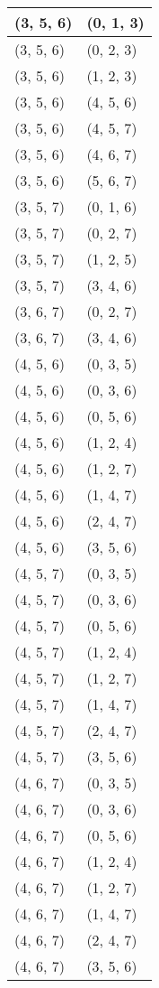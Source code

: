 \begin{footnotesize}
\begin{longtable}[c]{|l|l|}
(3, 5, 6)
&(0, 1, 3)
\\ \hline
(3, 5, 6)
&(0, 2, 3)
\\ \hline
(3, 5, 6)
&(1, 2, 3)
\\ \hline
(3, 5, 6)
&(4, 5, 6)
\\ \hline
(3, 5, 6)
&(4, 5, 7)
\\ \hline
(3, 5, 6)
&(4, 6, 7)
\\ \hline
(3, 5, 6)
&(5, 6, 7)
\\ \hline
(3, 5, 7)
&(0, 1, 6)
\\ \hline
(3, 5, 7)
&(0, 2, 7)
\\ \hline
(3, 5, 7)
&(1, 2, 5)
\\ \hline
(3, 5, 7)
&(3, 4, 6)
\\ \hline
(3, 6, 7)
&(0, 2, 7)
\\ \hline
(3, 6, 7)
&(3, 4, 6)
\\ \hline
(4, 5, 6)
&(0, 3, 5)
\\ \hline
(4, 5, 6)
&(0, 3, 6)
\\ \hline
(4, 5, 6)
&(0, 5, 6)
\\ \hline
(4, 5, 6)
&(1, 2, 4)
\\ \hline
(4, 5, 6)
&(1, 2, 7)
\\ \hline
(4, 5, 6)
&(1, 4, 7)
\\ \hline
(4, 5, 6)
&(2, 4, 7)
\\ \hline
(4, 5, 6)
&(3, 5, 6)
\\ \hline
(4, 5, 7)
&(0, 3, 5)
\\ \hline
(4, 5, 7)
&(0, 3, 6)
\\ \hline
(4, 5, 7)
&(0, 5, 6)
\\ \hline
(4, 5, 7)
&(1, 2, 4)
\\ \hline
(4, 5, 7)
&(1, 2, 7)
\\ \hline
(4, 5, 7)
&(1, 4, 7)
\\ \hline
(4, 5, 7)
&(2, 4, 7)
\\ \hline
(4, 5, 7)
&(3, 5, 6)
\\ \hline
(4, 6, 7)
&(0, 3, 5)
\\ \hline
(4, 6, 7)
&(0, 3, 6)
\\ \hline
(4, 6, 7)
&(0, 5, 6)
\\ \hline
(4, 6, 7)
&(1, 2, 4)
\\ \hline
(4, 6, 7)
&(1, 2, 7)
\\ \hline
(4, 6, 7)
&(1, 4, 7)
\\ \hline
(4, 6, 7)
&(2, 4, 7)
\\ \hline
(4, 6, 7)
&(3, 5, 6)
\\ \hline

\end{longtable}
\end{footnotesize}
